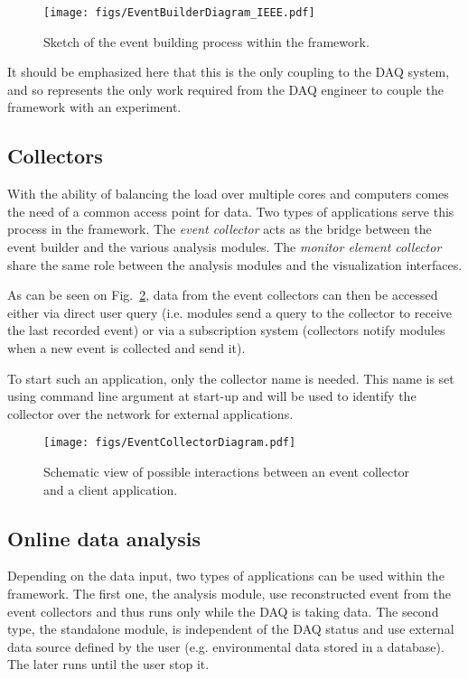 \documentclass[journal]{IEEEtran}
\begin{document}
\begin{figure}[htbp]
  \begin{center}
    \texttt{[image: figs/EventBuilderDiagram\_IEEE.pdf]}
    \caption{\label{fig:DQMEventBuilder} Sketch of the event building process within the framework.}
  \end{center}
\end{figure}

It should be emphasized here that this is the only coupling to the DAQ system, and so represents the only work required from the DAQ engineer to couple the framework with an experiment.


\subsection{Collectors}
With the ability of balancing the load over multiple cores and computers comes the need of a common access point for data. Two types of applications serve this process in the framework. The \textit{event collector} acts as the bridge between the event builder and the various analysis modules. The \textit{monitor element collector} share the same role between the analysis modules and the visualization interfaces.

As can be seen on Fig.~\ref{fig:DQMDataAccess}, data from the event collectors can then be accessed either via direct user query (i.e. modules send a query to the collector to receive the last recorded event) or via a subscription system (collectors notify modules when a new event is collected and send it).

To start such an application, only the collector name is needed. This name is set using command line argument at start-up and will be used to identify the collector over the network for external applications.

\begin{figure}[htbp]
  \begin{center}
    \texttt{[image: figs/EventCollectorDiagram.pdf]}
    \caption{\label{fig:DQMDataAccess} Schematic view of possible interactions between an event collector and a client application.}
  \end{center}
\end{figure}

\subsection{Online data analysis}
Depending on the data input, two types of applications can be used within the framework. The first one, the analysis module, use reconstructed event from the event collectors and thus runs only while the DAQ is taking data. The second type, the standalone module, is independent of the DAQ status and use external data source defined by the user (e.g. environmental data stored in a database). The later runs until the user stop it.
\end{document}
